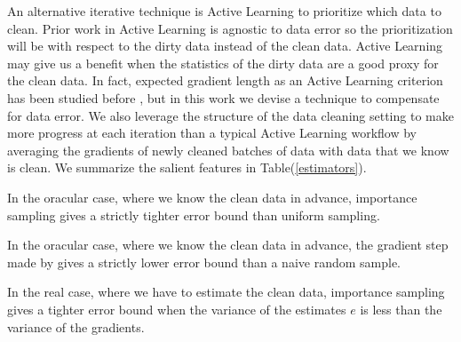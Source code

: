 An alternative iterative technique is Active Learning to prioritize which data to clean.
Prior work in Active Learning is agnostic to data error so the prioritization will be with respect to the dirty data instead of the clean data.
Active Learning may give us a benefit when the statistics of the dirty data are a good proxy for the clean data.
In fact, expected gradient length as an Active Learning criterion has been studied before \cite{settles2010active}, but in this work we devise a technique to compensate for data error.
We also leverage the structure of the data cleaning setting to make more progress at each iteration than a typical Active Learning workflow by averaging the gradients of newly cleaned batches of data with data that we know is clean.
We summarize the salient features in Table(\ref{estimators}).


\begin{lemma}
In the oracular case, where we know the clean data in advance, importance sampling gives a strictly tighter error bound than uniform sampling.
\end{lemma}

\begin{lemma}
In the oracular case, where we know the clean data in advance, the gradient step made by \sys gives a strictly lower error bound than a naive random sample.
\end{lemma}

\begin{lemma}
In the real case, where we have to estimate the clean data, importance sampling gives a tighter error bound when the variance of the estimates $e$ is less than the variance of the gradients.
\end{lemma}



